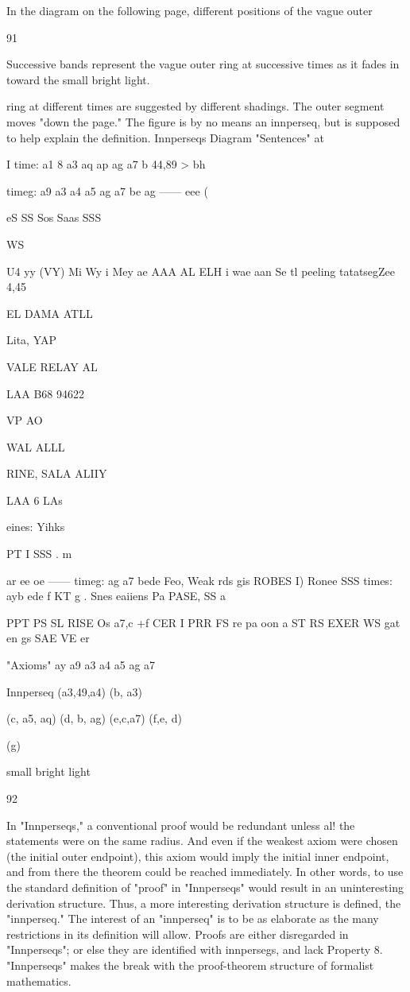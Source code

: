 \documentclass[10pt,twoside]{memoir}
\begin{document}
\begin{enumerate}
{{{{{{{{{{{{{{{{{In the diagram on the following page, different positions of the vague outer 


91 


Successive bands represent the vague outer ring at successive times as it fades in toward the small bright light. 


ring at different times are suggested by different shadings. The 
outer segment moves "down the page." The figure is by no means 
an innperseq, but is supposed to help explain the definition. 
Innperseqs Diagram 
"Sentences" at 


I time: a1 8 a3 aq ap ag a7 b 
44,89 > bh 


timeg: a9 a3 a4 a5 ag a7 be 
ag —— eee ( 


eS 
SS Sos 
Saas 
SSS 


WS 


U4 yy (VY) Mi Wy i 
Mey ae 
AAA AL ELH i wae aan Se tl 
peeling tatatsegZee 4,45 

EL DAMA ATLL 

Lita, YAP 

VALE RELAY AL 

LAA B68 94622 

VP AO 

WAL ALLL 

RINE, SALA ALIIY 

LAA 6 LAs 

eines: Yihks 


PT I SSS . m 

ar ee oe —— timeg: ag a7 bede 
Feo, Weak rds gis 
ROBES I) Ronee SSS times: ayb ede f 
KT g . 
Snes eaiiens Pa PASE, SS a 

PPT PS SL RISE Os a7,c +f 
CER I PRR 
FS re pa oon a 
ST RS EXER WS gat en gs 
SAE VE er 


"Axioms" ay a9 a3 a4 a5 ag a7 


Innperseq 
(a3,49,a4) 
(b, a3) 

(c, a5, aq) 
(d, b, ag) 
(e,c,a7) 
(f,e, d) 

(g) 


small bright light 


92 


In "Innperseqs," a conventional proof would be redundant unless al! 
the statements were on the same radius. And even if the weakest axiom were 
chosen (the initial outer endpoint), this axiom would imply the initial inner 
endpoint, and from there the theorem could be reached immediately. In 
other words, to use the standard definition of "proof" in "Innperseqs" 
would result in an uninteresting derivation structure. Thus, a more 
interesting derivation structure is defined, the "innperseq." The interest of 
an "innperseq" is to be as elaborate as the many restrictions in its definition 
will allow. Proofs are either disregarded in "Innperseqs"; or else they are 
identified with innpersegs, and lack Property 8. "Innperseqs" makes the 
break with the proof-theorem structure of formalist mathematics. 

}}}}}}}}}}}}}}}}}
\end{enumerate}
\end{document}
